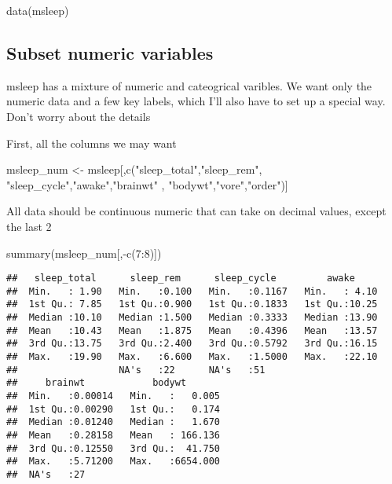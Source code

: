 \documentclass[
]{book}
\newenvironment{Shaded}{\begin{snugshade}}{\end{snugshade}}
\newcommand{\DecValTok}[1]{\textcolor[rgb]{0.00,0.00,0.81}{#1}}
\newcommand{\FunctionTok}[1]{\textcolor[rgb]{0.00,0.00,0.00}{#1}}
\newcommand{\NormalTok}[1]{#1}
\newcommand{\OtherTok}[1]{\textcolor[rgb]{0.56,0.35,0.01}{#1}}
\newcommand{\SpecialCharTok}[1]{\textcolor[rgb]{0.00,0.00,0.00}{#1}}
\newcommand{\StringTok}[1]{\textcolor[rgb]{0.31,0.60,0.02}{#1}}
\begin{document}
\begin{Shaded}
\begin{Highlighting}[]
\FunctionTok{data}\NormalTok{(msleep)}
\end{Highlighting}
\end{Shaded}

\hypertarget{subset-numeric-variables}{%
\subsection{Subset numeric variables}\label{subset-numeric-variables}}

msleep has a mixture of numeric and cateogrical varibles. We want only the numeric data and a few key labels, which I'll also have to set up a special way. Don't worry about the details

First, all the columns we may want

\begin{Shaded}
\begin{Highlighting}[]
\NormalTok{msleep\_num }\OtherTok{\textless{}{-}}\NormalTok{ msleep[,}\FunctionTok{c}\NormalTok{(}\StringTok{"sleep\_total"}\NormalTok{,}\StringTok{"sleep\_rem"}\NormalTok{,}
                        \StringTok{"sleep\_cycle"}\NormalTok{,}\StringTok{"awake"}\NormalTok{,}\StringTok{"brainwt"}\NormalTok{ ,}
                        \StringTok{"bodywt"}\NormalTok{,}\StringTok{"vore"}\NormalTok{,}\StringTok{"order"}\NormalTok{)]}
\end{Highlighting}
\end{Shaded}

All data should be continuous numeric that can take on decimal values, except the last 2

\begin{Shaded}
\begin{Highlighting}[]
\FunctionTok{summary}\NormalTok{(msleep\_num[,}\SpecialCharTok{{-}}\FunctionTok{c}\NormalTok{(}\DecValTok{7}\SpecialCharTok{:}\DecValTok{8}\NormalTok{)])}
\end{Highlighting}
\end{Shaded}

\begin{verbatim}
##   sleep_total      sleep_rem      sleep_cycle         awake      
##  Min.   : 1.90   Min.   :0.100   Min.   :0.1167   Min.   : 4.10  
##  1st Qu.: 7.85   1st Qu.:0.900   1st Qu.:0.1833   1st Qu.:10.25  
##  Median :10.10   Median :1.500   Median :0.3333   Median :13.90  
##  Mean   :10.43   Mean   :1.875   Mean   :0.4396   Mean   :13.57  
##  3rd Qu.:13.75   3rd Qu.:2.400   3rd Qu.:0.5792   3rd Qu.:16.15  
##  Max.   :19.90   Max.   :6.600   Max.   :1.5000   Max.   :22.10  
##                  NA's   :22      NA's   :51                      
##     brainwt            bodywt        
##  Min.   :0.00014   Min.   :   0.005  
##  1st Qu.:0.00290   1st Qu.:   0.174  
##  Median :0.01240   Median :   1.670  
##  Mean   :0.28158   Mean   : 166.136  
##  3rd Qu.:0.12550   3rd Qu.:  41.750  
##  Max.   :5.71200   Max.   :6654.000  
##  NA's   :27
\end{verbatim}
\end{document}
